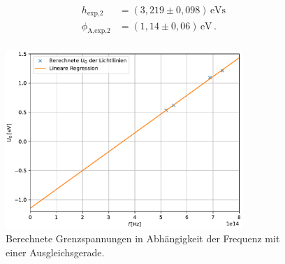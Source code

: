 \begin{align*}
    h_{\text{exp,}2} &= (3,219 \pm 0,098)\,\unit{\eV\second}\\
    \phi_{\text{A,exp,}2} &= (1,14 \pm 0,06) \, \unit{\eV}\,.\\
\end{align*}
\begin{figure}[H]
    \centering
    \includegraphics[width=0.8\textwidth]{Plots/planck_berechnet.pdf}
    \caption{Berechnete Grenzspannungen in Abhängigkeit der Frequenz mit einer Ausgleichsgerade.}
    \label{fig:Planck_berechnet}
\end{figure}
